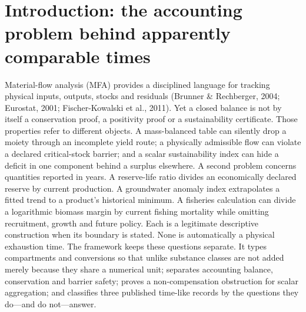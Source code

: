 \documentclass[11pt]{article}
\begin{document}
\section{Introduction: the accounting problem behind apparently comparable times}
Material-flow analysis (MFA) provides a disciplined language for tracking physical inputs, outputs, stocks and residuals (Brunner \& Rechberger, 2004; Eurostat, 2001; Fischer-Kowalski et al., 2011). Yet a closed balance is not by itself a conservation proof, a positivity proof or a sustainability certificate. Those properties refer to different objects. A mass-balanced table can silently drop a moiety through an incomplete yield route; a physically admissible flow can violate a declared critical-stock barrier; and a scalar sustainability index can hide a deficit in one component behind a surplus elsewhere.
A second problem concerns quantities reported in years. A reserve-life ratio divides an economically declared reserve by current production. A groundwater anomaly index extrapolates a fitted trend to a product's historical minimum. A fisheries calculation can divide a logarithmic biomass margin by current fishing mortality while omitting recruitment, growth and future policy. Each is a legitimate descriptive construction when its boundary is stated. None is automatically a physical exhaustion time.
The framework keeps these questions separate. It types compartments and conversions so that unlike substance classes are not added merely because they share a numerical unit; separates accounting balance, conservation and barrier safety; proves a non-compensation obstruction for scalar aggregation; and classifies three published time-like records by the questions they do---and do not---answer.
\end{document}
